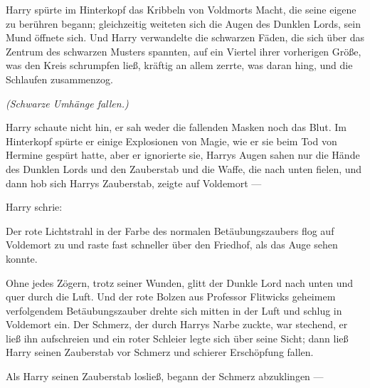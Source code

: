 Harry spürte im Hinterkopf das Kribbeln von Voldmorts Macht, die seine eigene zu berühren begann; gleichzeitig weiteten sich die Augen des Dunklen Lords, sein Mund öffnete sich.
Und Harry verwandelte die schwarzen Fäden, die sich über das Zentrum des schwarzen Musters spannten, auf ein Viertel ihrer vorherigen Größe, was den Kreis schrumpfen ließ, kräftig an allem zerrte, was daran hing, und die Schlaufen zusammenzog.

\emph{(Schwarze Umhänge fallen.)}

Harry schaute nicht hin, er sah weder die fallenden Masken noch das Blut. Im Hinterkopf spürte er einige Explosionen von Magie, wie er sie beim Tod von Hermine gespürt hatte, aber er ignorierte sie, Harrys Augen sahen nur die Hände des Dunklen Lords und den Zauberstab und die Waffe, die nach unten fielen, und dann hob sich Harrys Zauberstab, zeigte auf Voldemort —

Harry schrie: 

Der rote Lichtstrahl in der Farbe des normalen Betäubungszaubers flog auf Voldemort zu und raste fast schneller über den Friedhof, als das Auge sehen konnte.

Ohne jedes Zögern, trotz seiner Wunden, glitt der Dunkle Lord nach unten und quer durch die Luft. Und der rote Bolzen aus Professor Flitwicks geheimem verfolgendem Betäubungszauber drehte sich mitten in der Luft und schlug in Voldemort ein.
Der Schmerz, der durch Harrys Narbe zuckte, war stechend, er ließ ihn aufschreien und ein roter Schleier legte sich über seine Sicht; dann ließ Harry seinen Zauberstab vor Schmerz und schierer Erschöpfung fallen.

Als Harry seinen Zauberstab losließ, begann der Schmerz abzuklingen —

